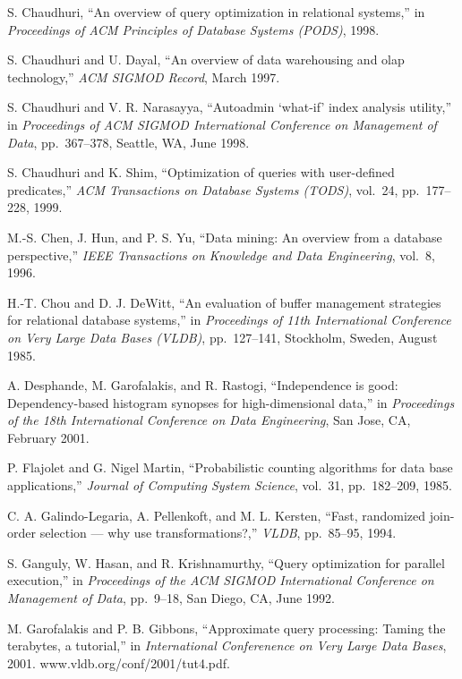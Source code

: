 \documentclass[a4paper,11pt,twoside,openright]{book}
\begin{document}
\begin{enumerate}[label={[\arabic*]}]
  S. Chaudhuri, ``An overview of query optimization in relational
  systems,'' in \emph{Proceedings of ACM Principles of Database Systems (PODS)}, 1998.
\item
  S. Chaudhuri and U. Dayal, ``An overview of data warehousing and olap
  technology,'' \emph{ACM SIGMOD Record}, March 1997.
\item
  S. Chaudhuri and V. R. Narasayya, ``Autoadmin `what-if' index analysis
  utility,'' in \emph{Proceedings of ACM SIGMOD International Conference
  on Management of Data}, pp.~367--378, Seattle, WA, June 1998.
\item
  S. Chaudhuri and K. Shim, ``Optimization of queries with user-defined
  predicates,'' \emph{ACM Transactions on Database Systems (TODS)},
  vol.~24, pp.~177--228, 1999.
\item
  M.-S. Chen, J. Hun, and P. S. Yu, ``Data mining: An overview from a
  database perspective,'' \emph{IEEE Transactions on Knowledge and Data
  Engineering}, vol.~8, 1996.
\item
  H.-T. Chou and D. J. DeWitt, ``An evaluation of buffer management
  strategies for relational database systems,'' in \emph{Proceedings of
  11th International Conference on Very Large Data Bases (VLDB)},
  pp.~127--141, Stockholm, Sweden, August 1985.
\item
  A. Desphande, M. Garofalakis, and R. Rastogi, ``Independence is good:
  Dependency-based histogram synopses for high-dimensional data,'' in
  \emph{Proceedings of the 18th International Conference on Data
  Engineering}, San Jose, CA, February 2001.
\item
  P. Flajolet and G. Nigel Martin, ``Probabilistic counting algorithms
  for data base applications,'' \emph{Journal of Computing System
  Science}, vol.~31, pp.~182--209, 1985.
\item
  C. A. Galindo-Legaria, A. Pellenkoft, and M. L. Kersten, ``Fast,
  randomized join-order selection --- why use transformations?,''
  \emph{VLDB}, pp.~85--95, 1994.
\item
  S. Ganguly, W. Hasan, and R. Krishnamurthy, ``Query optimization for
  parallel execution,'' in \emph{Proceedings of the ACM SIGMOD
  International Conference on} \emph{Management of Data}, pp.~9--18, San
  Diego, CA, June 1992.
\item
  M. Garofalakis and P. B. Gibbons, ``Approximate query processing:
  Taming the terabytes, a tutorial,'' in \emph{International
  Conferenence on Very Large Data} \emph{Bases}, 2001.
  www.vldb.org/conf/2001/tut4.pdf.
\item

\end{enumerate}
\end{document}
